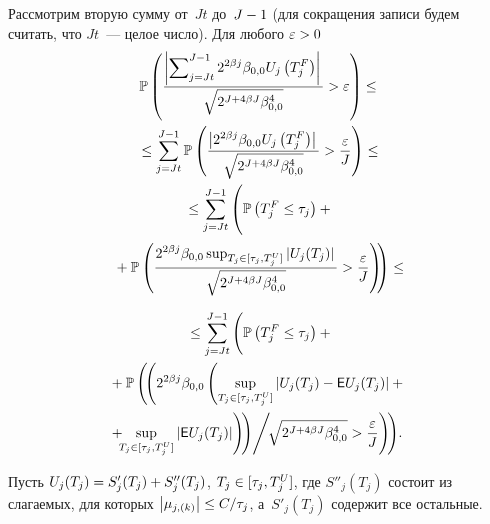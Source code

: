 \begin{multicols}{2}
Рассмотрим вторую сумму от~$Jt$ до~$J\hm-1$ (для сокращения записи будем считать, 
что $Jt$~--- целое число). Для любого $\varepsilon\hm>0$
\begin{multline*}
\mathbb{P}\left(\fr{\abs{\sum\nolimits_{j=Jt}^{J-1} 2^{2\beta j} \beta_{0,0} 
U_j\left(T_{j}^F\right)}}{{\sqrt{2^{J+4\beta J} \beta_{0,0}^4}}}>\varepsilon\right) \leq {}\\
{}\leq
\sum\limits_{j=Jt}^{J-1}\mathbb{P}\left(\fr{\left\vert 2^{2\beta j} \beta_{0,0} 
U_j\left(T_{j}^F\right)\right\vert }{{\sqrt{2^{J+4\beta J} \beta_{0,0}^4}}}>\fr{\varepsilon}{J}\right)\leq
{}\\
{}\leq
\sum\limits_{j=Jt}^{J-1}\left(
\vphantom{\left(\fr{2^{2\beta j} 
\beta_{0,0}\sup\nolimits_{T_{j}\in[\tau_j,T_{j}^U]}\abs{U_j(T_{j})}}{\sqrt{2 ^{J+4\beta J} \beta_{0,0}^4}}>\fr{\varepsilon}{J}\right)}
\mathbb{P}\left(T_{j}^F\leq \tau_j\right) +  {}\right.\\
\left.{}+
\mathbb{P}\left(\fr{2^{2\beta j} 
\beta_{0,0}\sup\nolimits_{T_{j}\in[\tau_j,T_{j}^U]}\abs{U_j(T_{j})}}{\sqrt{2
^{J+4\beta J} \beta_{0,0}^4}}>\fr{\varepsilon}{J}\right)\!\!\right)\leq
{}
\end{multline*}

\noindent
\begin{multline}
{}\leq 
\sum\limits_{j=J t}^{J-1}\Bigg(
\mathbb{P}\left(T_{j}^F\leq \tau_j\right) + {}\\
\left.{}+
\mathbb{P}\left(\!\left(
2^{2\beta j} 
\beta_{0,0}\left(\sup\limits_{T_{j}\in[\tau_j,T_{j}^U]}\abs{U_j(T_{j})-{\sf E} 
U_j(T_{j})}+{}\right.\right.\right.\right.\\
\!\!\!\!\!\!\!\!\left.\left.\left.{}+\!\!\!\sup\limits_{T_{j}\in[\tau_j,T_{j}^U]}\abs{{\sf E}
U_j(T_{j})}\right)\!\right)\!\Bigg/\! {\sqrt{2^{J+4\beta J} 
\beta_{0,0}^4}}>\fr{\varepsilon}{J}\right)\!\!\Bigg).\!\!
\label{second_term}
\end{multline}


Пусть $U_j(T_{j})= S'_{j}(T_{j})\hm+ S''_{j}(T_{j})$, $T_{j}\hm\in[\tau_j,T_{j}^U]$, 
где $S''_{j}(T_{j})$ состоит из слагаемых, для которых $\abs{\mu_{j,(k)}}\hm\leq 
C/\tau_j$, а~$S'_{j} (T_{j})$ содержит все остальные.


\end{multicols}
